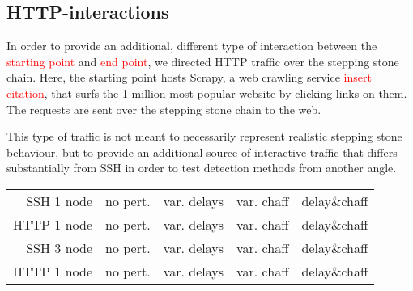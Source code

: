 \documentclass[conference]{IEEEtran}\usepackage[]{graphicx}\usepackage[]{color}
\begin{document}
\subsection{HTTP-interactions}
 
In order to provide an additional, different type of interaction between the \textcolor{red}{starting point} and \textcolor{red}{end point}, we directed HTTP traffic over the stepping stone chain. Here, the starting point hosts Scrapy, a web crawling service \textcolor{red}{insert citation}, that surfs the 1 million most popular website by clicking links on them. The requests are sent over the stepping stone chain to the web. 

This type of traffic is not meant to necessarily represent realistic stepping stone behaviour, but to provide an additional source of interactive traffic that differs substantially from SSH in order to test detection methods from another angle.





\begin{tabular}{r|cccc}
SSH 1 node& no pert.&var. delays&var. chaff&delay\&chaff \\
HTTP 1 node& no pert.&var. delays&var. chaff&delay\&chaff \\
SSH 3 node& no pert.&var. delays&var. chaff&delay\&chaff \\
HTTP 1 node& no pert.&var. delays&var. chaff&delay\&chaff \\
\end{tabular}


 
\cite{sommer_outside_2010}


\end{document}
